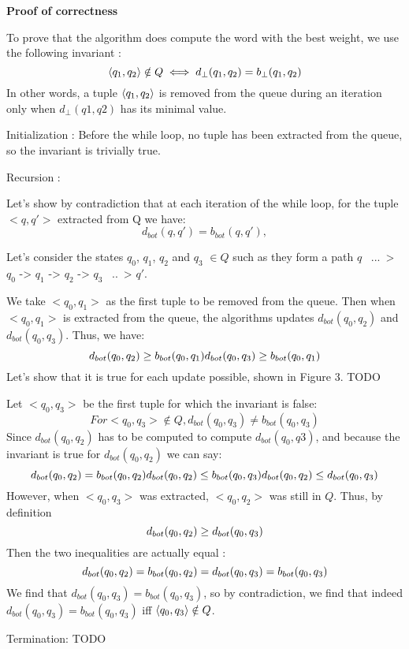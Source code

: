 \textbf{Proof of correctness}

To prove that the algorithm does compute the word with the best weight, we use the following invariant :
$$
\<q_1, q_2> \notin Q \iff d_{\bot}(q_1, q_2) = b_{\bot}(q_1, q_2)
$$
In other words, a tuple $\<q_1, q_2>$ is removed from the queue during an iteration only when $d_{\bot}(q1, q2)$ has its minimal value.

Initialization : Before the while loop, no tuple has been extracted from the queue, so the invariant is trivially true.

Recursion : 

Let's show by contradiction that at each iteration of the while loop, for the tuple $<q, q'>$ extracted from Q we have:
$$
d_{bot}(q, q') = b_{bot}(q, q'), 
$$


Let's consider the states $q_0$, $q_1$, $q_2$ and $q_3$ $\in Q$ such as they form a path $q$ ~...~>$q_0$ -> $q_1$ -> $q_2$ -> $q_3$ ~..~> $q'$.

We take $<q_0, q_1>$ as the first tuple to be removed from the queue. Then when $<q_0, q_1>$ is extracted from the queue, the algorithms updates $d_{bot}(q_0, q_2)$ and $d_{bot}(q_0, q_3)$. Thus, we have:
$$
d_{bot}(q_0, q_2) \geq b_{bot}(q_0, q_1) \\
d_{bot}(q_0, q_3) \geq b_{bot}(q_0, q_1)
$$
Let's show that it is true for each update possible, shown in Figure 3. TODO

Let $<q_0, q_3>$ be the first tuple for which the invariant is false:
$$
For <q_0, q_3> \notin Q, d_{bot} (q_0, q_3) \neq b_{bot} (q_0, q_3)
$$
Since $d_{bot}(q_0, q_2)$ has to be computed to compute $d_{bot}(q_0, q3)$, and because the invariant is true for  $d_{bot}(q_0, q_2)$ we can say:
$$
d_{bot}(q_0, q_2) = b_{bot}(q_0, q_2) \\
d_{bot}(q_0, q_2) \leq b_{bot}(q_0, q_3) \\
\\d_{bot}(q_0, q_2) \leq d_{bot}(q_0, q_3) \\
$$
 However, when $<q_0, q_3>$ was extracted, $<q_0, q_2>$ was still in $Q$. Thus, by definition 
$$
d_{bot}(q_0, q_2) \geq d_{bot}(q_0, q_3) \\
$$
Then the two inequalities are actually equal : 
$$
d_{bot}(q_0, q_2) = b_{bot}(q_0, q_2) = d_{bot}(q_0, q_3) = b_{bot}(q_0, q_3) \\
$$
We find that $d_{bot}(q_0, q_3) = b_{bot}(q_0, q_3)$, so by contradiction, we find that indeed $d_{bot}(q_0, q_3) = b_{bot}(q_0, q_3)$ iff 
$\<q_0, q_3> \notin Q$.


Termination: TODO 